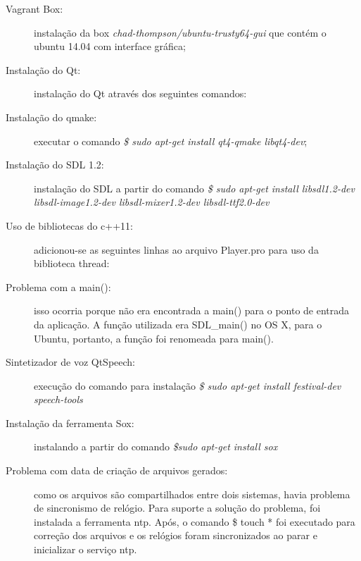 \begin{description}
	\item [Vagrant Box:] instalação da box \textit{chad-thompson/ubuntu-trusty64-gui} que contém o ubuntu 14.04 com interface gráfica;
	\item [Instalação do Qt:] instalação do Qt através dos seguintes comandos:
	\item [Instalação do qmake:] executar o comando \textit{\$ sudo apt-get install qt4-qmake libqt4-dev};
	\item [Instalação do SDL 1.2:] instalação do SDL a partir do comando \textit{\$ sudo apt-get install libsdl1.2-dev libsdl-image1.2-dev libsdl-mixer1.2-dev libsdl-ttf2.0-dev}
	\item [Uso de bibliotecas do c++11:] adicionou-se as seguintes linhas ao arquivo Player.pro para uso da biblioteca thread:
	\item [Problema com a main():] isso ocorria porque não era encontrada a main() para o ponto de entrada da aplicação. A função utilizada era SDL\_main() no OS X, para o Ubuntu, portanto, a função foi renomeada para main().
	\item [Sintetizador de voz QtSpeech:] execução do comando para instalação \textit{\$ sudo apt-get install festival-dev speech-tools}
	\item [Instalação da ferramenta Sox:] instalando a partir do comando \textit{\$sudo apt-get install sox}
	\item [Problema com data de criação de arquivos gerados:] como os arquivos são compartilhados entre dois sistemas, havia problema de sincronismo de relógio. Para suporte a solução do problema, foi instalada a ferramenta ntp. Após, o comando {\$ touch *} foi executado para correção dos arquivos e os relógios foram sincronizados ao parar e inicializar o serviço ntp.
\end{description}

